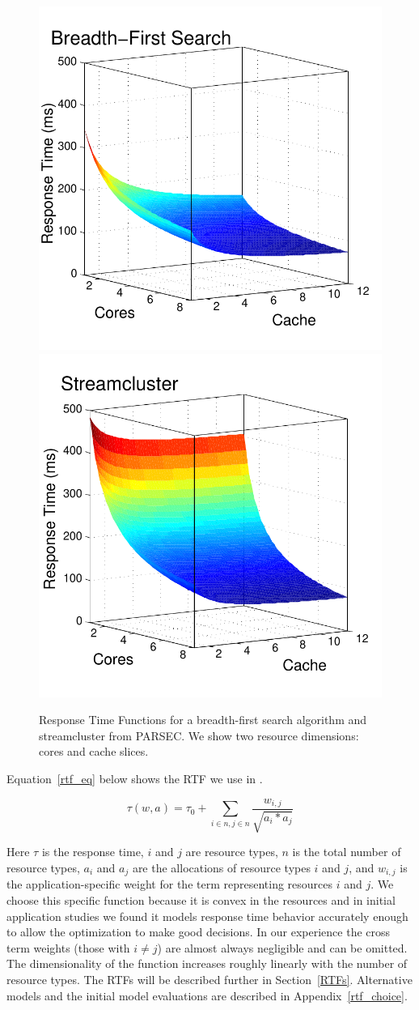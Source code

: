 \begin{figure}[hb]
\includegraphics*[bb=0 0 360 360,width=.49\columnwidth]{bfs-fig.pdf}
\includegraphics*[bb=0 0 360
  360,width=.49\columnwidth]{streamcluster-fig.pdf}
\caption{\label{sample_rtf} Response Time Functions for a
  breadth-first search algorithm and streamcluster from PARSEC. We show two resource dimensions: cores and cache slices.}
\end{figure}

Equation~\ref{rtf_eq} below shows the RTF we use in \pacora.

\begin{equation}\label{rtf_eq}
\tau(w,a) = \tau_0 + \sum_{i\in n,j\in n}{\frac{w_{i,j}}{\sqrt{a_i * a_j}}}
\end{equation}

Here $\tau$ is the response time, $i$ and $j$ are
resource types, $n$ is the total number of resource types,
$a_{i}$ and $a_{j}$ are the allocations of resource types $i$
and $j$, and $w_{i,j}$ is the application-specific weight for
the term representing resources $i$ and $j$.
We choose this specific function because it is convex in the resources and in initial application studies
we found it models response time behavior accurately enough to allow the optimization to make good decisions.
In our experience the cross term weights (those with $i\neq j$) are almost always negligible and can be omitted.
The dimensionality of the function increases roughly linearly with the number of resource types.
The RTFs will be described further in Section~\ref{RTFs}.
Alternative models and the initial model evaluations are described in Appendix~\ref{rtf_choice}.


